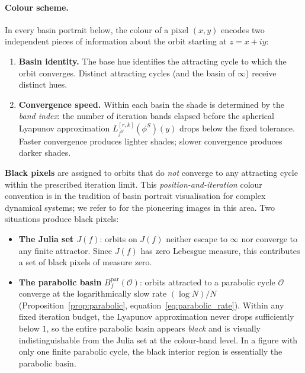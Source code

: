 \documentclass[12pt]{article}
\theoremstyle{definition}
\newcommand{\Lfsrk}{L_{f^S}^{[r,k]}(\phi^S)}
\begin{document}
\paragraph{Colour scheme.}
In every basin portrait below, the colour of a pixel $(x,y)$ encodes
two independent pieces of information about the orbit starting at $z=x+iy$:
\begin{enumerate}[label=(\roman*)]
  \item \textbf{Basin identity.}  The base hue identifies the attracting
        cycle to which the orbit converges.  Distinct attracting cycles
        (and the basin of $\infty$) receive distinct hues.
  \item \textbf{Convergence speed.}  Within each basin the shade is
        determined by the \emph{band index}: the number of iteration
        bands elapsed before the spherical Lyapunov approximation
        $\Lfsrk(y)$ drops below the fixed tolerance.  Faster convergence
        produces lighter shades; slower convergence produces darker shades.
\end{enumerate}
\textbf{Black pixels} are assigned to orbits that do \emph{not} converge
to any attracting cycle within the prescribed iteration limit.
This \emph{position-and-iteration} colour convention is in the tradition
of basin portrait visualisation for complex dynamical systems; we refer
to \cite{PeitgenRichter1986} for the pioneering images in this area.
Two situations produce black pixels:
\begin{itemize}
  \item \textbf{The Julia set $J(f)$}: orbits on $J(f)$ neither escape
        to $\infty$ nor converge to any finite attractor.  Since $J(f)$
        has zero Lebesgue measure, this contributes a set of black pixels
        of measure zero.
  \item \textbf{The parabolic basin} $B^{\mathrm{par}}_f(\mathcal{O})$:
        orbits attracted to a parabolic cycle $\mathcal{O}$ converge at
        the logarithmically slow rate $(\log N)/N$
        (Proposition~\ref{prop:parabolic}, equation~\eqref{eq:parabolic_rate}).
        Within any fixed iteration budget, the Lyapunov approximation
        never drops sufficiently below $1$, so the entire parabolic basin
        appears \emph{black} and is visually indistinguishable from the
        Julia set at the colour-band level.
        In a figure with only one finite parabolic cycle, the black
        interior region is essentially the parabolic basin.
\end{itemize}
\end{document}
